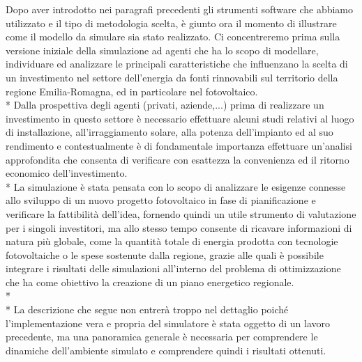 \documentclass[12pt,a4paper,openright,twoside]{report}
\begin{document}
Dopo aver introdotto nei paragrafi precedenti gli strumenti software che abbiamo utilizzato e il tipo di metodologia scelta, è giunto ora il momento di illustrare come il modello da simulare sia stato realizzato. Ci concentreremo prima sulla versione iniziale della simulazione ad agenti che ha lo scopo di modellare, individuare ed analizzare le principali caratteristiche che influenzano la scelta di un investimento nel settore dell'energia da fonti rinnovabili sul territorio della regione Emilia-Romagna, ed in particolare nel fotovoltaico.\\*
Dalla prospettiva degli agenti (privati, aziende,...) prima di realizzare un investimento in questo settore è necessario effettuare alcuni studi relativi al luogo di installazione, all'irraggiamento solare, alla potenza dell'impianto ed al suo rendimento e contestualmente è di fondamentale importanza effettuare un'analisi approfondita che consenta di verificare con esattezza la convenienza ed il ritorno economico dell'investimento.\\*
La simulazione è stata pensata con lo scopo di analizzare le esigenze connesse allo sviluppo di un nuovo progetto  fotovoltaico in fase di pianificazione e verificare la fattibilità dell'idea, fornendo quindi un utile strumento di valutazione per i singoli investitori, ma allo stesso tempo consente di ricavare informazioni di natura più globale, come la quantità totale di energia prodotta con tecnologie fotovoltaiche o le spese sostenute dalla regione, grazie alle quali è possibile integrare i risultati delle simulazioni all'interno del problema di ottimizzazione che ha come obiettivo la creazione di un piano energetico regionale.\\* \\*
La descrizione che segue non entrerà troppo nel dettaglio poiché l'implementazione vera e propria del simulatore è stata oggetto di un lavoro precedente, ma una panoramica generale è necessaria per comprendere le dinamiche dell'ambiente simulato e comprendere quindi i risultati ottenuti.
\end{document}
